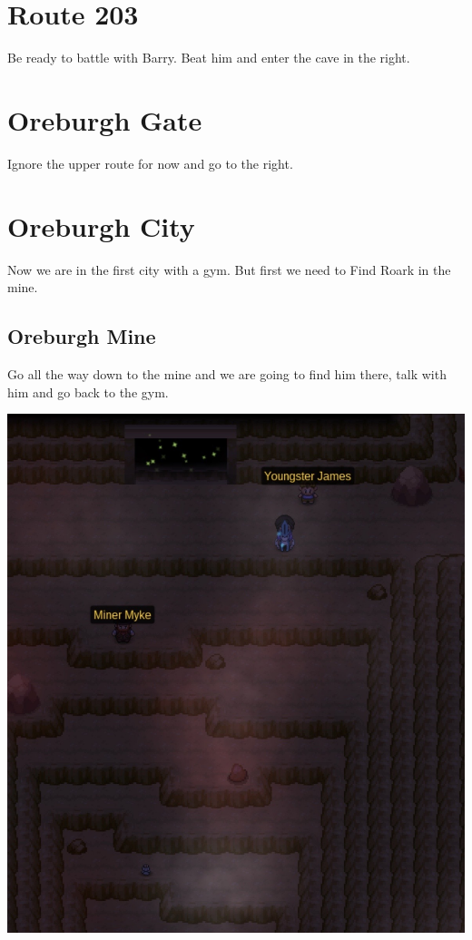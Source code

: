 \documentclass[11pt]{article}
\begin{document}


\section{Route 203}\label{sec:Route_203}

Be ready to battle with Barry.
Beat him and enter the cave in the right.



\section{Oreburgh Gate}\label{sec:oreburgh-gate}

Ignore the upper route for now and go to the right.



\section{Oreburgh City}\label{sec:oreburgh-city}

Now we are in the first city with a gym.
But first we need to Find Roark in the mine.

\subsection{Oreburgh Mine}\label{subsec:oreburgh-mine}
Go all the way down to the mine and we are going to find him there,
talk with him and go back to the gym.



\includegraphics[width=\textwidth]{walkthrough/Sinnoh/oreburgh_mine}
\end{document}
